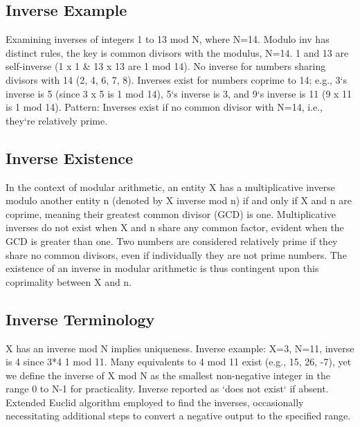 \subsection*{Inverse  Example}
Examining inverses of integers 1 to 13 mod N, where N=14.
Modulo inv has distinct rules, the key is common divisors with the modulus, N=14.
1 and 13 are self-inverse (1 x 1 \& 13 x 13 are 1 mod 14).
No inverse for numbers sharing divisors with 14 (2, 4, 6, 7, 8).
Inverses exist for numbers coprime to 14; e.g., 3`s inverse is 5 (since 3 x 5 is 1 mod 14), 5`s inverse is 3, and 9`s inverse is 11 (9 x 11 is 1 mod 14).
Pattern: Inverses exist if no common divisor with N=14, i.e., they`re relatively prime.

\subsection*{Inverse  Existence}
In the context of modular arithmetic, an entity X has a multiplicative inverse modulo another entity n (denoted by X inverse mod n) if and only if X and n are coprime, meaning their greatest common divisor (GCD) is one.
Multiplicative inverses do not exist when X and n share any common factor, evident when the GCD is greater than one.
Two numbers are considered relatively prime if they share no common divisors, even if individually they are not prime numbers.
The existence of an inverse in modular arithmetic is thus contingent upon this coprimality between X and n.

\subsection*{Inverse  Terminology}
X has an inverse mod N implies uniqueness.
Inverse example: X=3, N=11, inverse is 4 since 3*4  1 mod 11.
Many equivalents to 4 mod 11 exist (e.g., 15, 26, -7), yet we define the inverse of X mod N as the smallest non-negative integer in the range 0 to N-1 for practicality.
Inverse reported as `does not exist` if absent.
Extended Euclid algorithm employed to find the inverses, occasionally necessitating additional steps to convert a negative output to the specified range.

